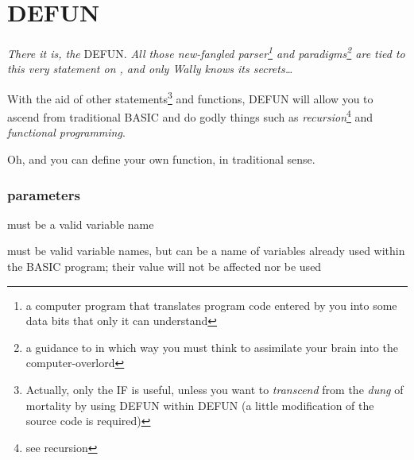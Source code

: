 \section{DEFUN}

\emph{There it is, the} DEFUN. \emph{All those new-fangled parser\footnote{a computer program that translates program code entered by you into some data bits that only it can understand} and paradigms\footnote{a guidance to in which way you must think to assimilate your brain into the computer-overlord} are tied to this very statement on \tbas{}, and only Wally knows its secrets\ldots}


With the aid of other statements\footnote{Actually, only the IF is useful, unless you want to \emph{transcend} from the \emph{dung} of mortality by using DEFUN within DEFUN (a little modification of the source code is required)} and functions, DEFUN will allow you to ascend from traditional BASIC and do godly things such as \emph{recursion}\footnote{see recursion} and \emph{functional programming}.

Oh, and you can define your own function, in traditional  sense.

\subsubsection*{parameters}

\begin{itemlist}
\item {} must be a valid variable name
\item {} must be valid variable names, but can be a name of variables already used within the BASIC program; their value will not be affected nor be used
\end{itemlist}
